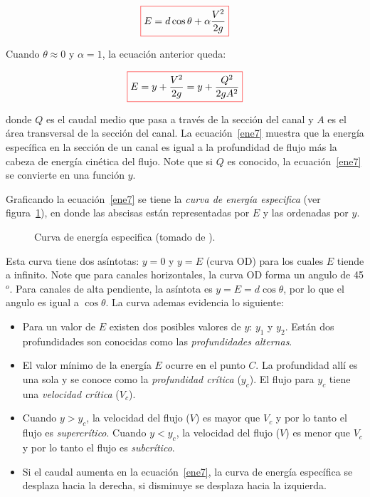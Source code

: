 \documentclass[11pt, oneside]{article}
\begin{document}
\begin{equation}
\color{red}\boxed{\color{black} E =   d\cos \theta + \alpha\frac{V^2}{2g}}
\label{ene6}
\end{equation}

Cuando $\theta \approx 0$ y $\alpha = 1$, la ecuaci\'on anterior queda:
 
\begin{equation}
\color{red}\boxed{\color{black} E =   y  + \frac{V^2}{2g} = y + \frac{Q^2}{2g A^2 }}
\label{ene7}
\end{equation}

donde $Q$ es el caudal medio que pasa a trav\'es de la secci\'on del canal y $A$ es el \'area transversal de la secci\'on del canal. La ecuaci\'on~\ref{ene7} muestra que la energ\'ia espec\'ifica en la secci\'on de un canal es igual a la profundidad de flujo m\'as la cabeza de energ\'ia cin\'etica del flujo. Note que si $Q$ es conocido, la ecuaci\'on~\ref{ene7} se convierte en  una  funci\'on $y$.

Graficando la ecuaci\'on~\ref{ene7} se tiene la \emph{curva de energ\'ia especifica} (ver figura~\ref{fig10}), en donde las abscisas est\'an representadas por $E$ y las ordenadas por $y$.
\begin{figure}[h]
\centering
\caption{Curva de energ\'ia especifica (tomado de \cite{VChow}).}
\label{fig10}
\end{figure}

Esta curva tiene dos asíntotas: $y=0$ y $y=E$ (curva OD) para los cuales $E$ tiende a infinito. Note que para canales horizontales, la curva OD forma un angulo de 45$^o$. Para canales de alta pendiente, la asíntota es $y=E=d \cos \theta$, por lo que el angulo es igual a $\cos \theta$. La curva ademas evidencia lo siguiente:
\begin{itemize}
\item Para un valor de $E$ existen dos posibles valores de $y$: $y_1$ y $y_2$. Est\'an dos profundidades son conocidas como las \emph{profundidades alternas}.
\item El valor m\'inimo de la energ\'ia $E$ ocurre en el punto $C$. La profundidad all\'i es una sola y se conoce como la \emph{profundidad cr\'itica} ($y_c$). El flujo para $y_c$ tiene una \emph{velocidad cr\'itica} ($V_c$). 
\item Cuando $y > y_c$, la velocidad del flujo ($V$) es mayor que $V_c$ y por lo tanto el flujo es \emph{supercr\'itico}. Cuando $y < y_c$, la velocidad del flujo ($V$) es menor que $V_c$ y por lo tanto el flujo es \emph{subcr\'itico}.
\item Si el caudal aumenta en la ecuaci\'on~\ref{ene7}, la curva de energ\'ia espec\'ifica se desplaza hacia la derecha, si disminuye se desplaza hacia la izquierda. 
\end{itemize}
\end{document}
